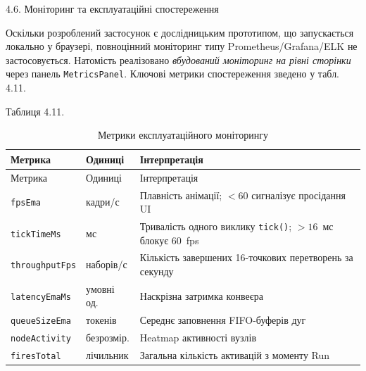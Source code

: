 \documentclass[
]{article}
\begin{document}
\protect{}\label{Xddcc2d41e218d4eab0104affeeaeb116ef3d72e}{}4.6.
Моніторинг та експлуатаційні спостереження

Оскільки розроблений застосунок є дослідницьким прототипом, що
запускається локально у браузері, повноцінний моніторинг типу
Prometheus/Grafana/ELK не застосовується. Натомість реалізовано
\emph{вбудований моніторинг на рівні сторінки} через панель
\texttt{MetricsPanel}. Ключові метрики спостереження зведено у табл.
4.11.

Таблиця 4.11.

\begin{longtable}[]{@{}
  >{\raggedright\arraybackslash}p{}
  >{\raggedright\arraybackslash}p{}
  >{\raggedright\arraybackslash}p{}@{}}
\caption{Метрики експлуатаційного моніторингу}\tabularnewline
\toprule\noalign{}
\begin{minipage}[b]{\linewidth}\raggedright
Метрика
\end{minipage} & \begin{minipage}[b]{\linewidth}\raggedright
Одиниці
\end{minipage} & \begin{minipage}[b]{\linewidth}\raggedright
Інтерпретація
\end{minipage} \\
\midrule\noalign{}
\endfirsthead
\toprule\noalign{}
\begin{minipage}[b]{\linewidth}\raggedright
Метрика
\end{minipage} & \begin{minipage}[b]{\linewidth}\raggedright
Одиниці
\end{minipage} & \begin{minipage}[b]{\linewidth}\raggedright
Інтерпретація
\end{minipage} \\
\midrule\noalign{}
\endhead
\bottomrule\noalign{}
\endlastfoot
\texttt{fpsEma} & кадри/с & Плавність анімації; \(< 60\) сигналізує
просідання UI \\
\texttt{tickTimeMs} & мс & Тривалість одного виклику
\texttt{tick}\texttt{()}; \(> 16\)~мс блокує 60~fps \\
\texttt{throughputFps} & наборів/с & Кількість завершених 16-точкових
перетворень за секунду \\
\texttt{latencyEmaMs} & умовні од. & Наскрізна затримка конвеєра \\
\texttt{queueSizeEma} & токенів & Середнє заповнення FIFO-буферів дуг \\
\texttt{nodeActivity} & безрозмір. & Heatmap активності вузлів \\
\texttt{firesTotal} & лічильник & Загальна кількість активацій з моменту
Run \\
\end{longtable}
\end{document}
